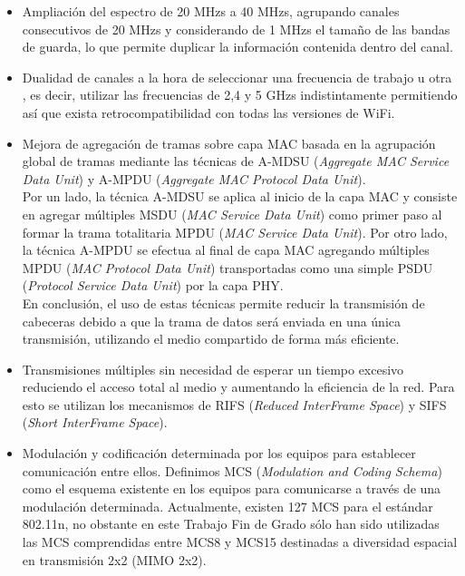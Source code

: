 \begin{itemize}
    \item Ampliación del espectro de 20 MHzs a 40 MHzs, agrupando canales consecutivos de 20 MHzs y considerando de 1 MHzs el tamaño de las bandas de guarda, lo que permite duplicar la información contenida dentro del canal.
    
    \item Dualidad de canales a la hora de seleccionar una frecuencia de trabajo u otra , es decir, utilizar las frecuencias de 2,4 y 5 GHzs indistintamente permitiendo así que exista retrocompatibilidad con todas las versiones de WiFi.
    \item Mejora de agregación de tramas sobre capa MAC basada en la agrupación global de tramas mediante las técnicas de A-MDSU (\textit{Aggregate MAC Service Data Unit}) y A-MPDU (\textit{Aggregate MAC Protocol Data Unit}). \\
    Por un lado, la técnica A-MDSU se aplica al inicio de la capa MAC y consiste en agregar múltiples MSDU (\textit{MAC Service Data Unit}) como primer paso al formar la trama totalitaria MPDU (\textit{MAC Service Data Unit}). Por otro lado, la técnica A-MPDU se efectua al final de capa MAC agregando múltiples MPDU (\textit{MAC Protocol Data Unit}) transportadas como una simple PSDU (\textit{Protocol Service Data Unit}) por la capa PHY.\\
    En conclusión, el uso de estas técnicas permite reducir la transmisión de cabeceras debido a que la trama de datos será enviada en una única transmisión, utilizando el medio compartido de forma más eficiente.
    
    \item Transmisiones múltiples sin necesidad de esperar un tiempo excesivo reduciendo el acceso total al medio y aumentando la eficiencia de la red. Para esto se utilizan los mecanismos de RIFS (\textit{Reduced InterFrame Space}) y SIFS (\textit{Short InterFrame Space}).
    
    \item Modulación y codificación determinada por los equipos para establecer comunicación entre ellos. Definimos MCS (\textit{Modulation and Coding Schema}) como el esquema existente en los equipos para comunicarse a través de una modulación determinada. Actualmente, existen 127 MCS para el estándar 802.11n, no obstante en este Trabajo Fin de Grado sólo han sido utilizadas las MCS comprendidas entre MCS8 y MCS15 destinadas a diversidad espacial en transmisión 2x2 (MIMO 2x2).
\end{itemize}

